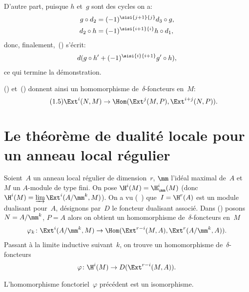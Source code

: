 D'autre part\pageoriginale, puisque $h$ et~$g$ sont des cycles on a:
\begin{align*}
g\circ d_{2} &= (-1)^{\sisi{j+1}{j}}d_{3}\circ g, \\
d_{2}\circ h &= (-1)^{\sisi{i+1}{i}}h\circ d_{1},
\end{align*}
donc, finalement,~() s'\'ecrit:
$$d(g\circ h^{\prime}+(-1)^{\sisi{i}{i+1}}g^{\prime}\circ h),
$$
ce qui termine la d\'emonstration.

() et~() donnent ainsi un homomorphisme de~$\delta$-foncteurs en~$M$:
\begin{equation*} \label{eq:V.1.5} \tag{1.5} \Ext^{i}(N, M)\to\Hom(\Ext^{j}(M, P), \Ext^{i+j}(N, P)).
\end{equation*}

\section{Le th\'eor\`eme de dualit\'e locale pour un anneau local r\'egulier} \label{V.2}

\setcounter{equation}{12}

Soient~$A$ un anneau local r\'egulier de dimension~$r$, $\mm$ l'id\'eal maximal de~$A$ et~$M$ un $A$-module de type fini. \label{pV2.4}On pose $\H^{i}(M)=\H^{i}_{\mm}(M)$ (donc $\H^{i}(M)=\varinjlim\Ext^{i}(A/\mm^{k}, M)$). On a vu (~) que~$I=\H^{r}(A)$ est un module dualisant pour~$A$, d\'esignons par~$D$ le foncteur dualisant associ\'e. Dans () posons $N=A/\mm^{k}$, $P=A$ alors on obtient un homomorphisme de~$\delta$-foncteurs en~$M$
\begin{equation} \label{eq:V.13} \varphi_{k}\colon\Ext^{i}(A/\mm^{k}, M)\to\Hom(\Ext^{r-i}(M, A), \Ext^{r}(A/\mm^{k}, A)).
\end{equation}
Passant \`a la limite inductive suivant~$k$, on trouve un homomorphisme de~$\delta$-foncteurs
\begin{equation} \label{eq:V.14} \varphi\colon\H^{i}(M)\to D(\Ext^{r-i}(M, A)).
\end{equation}

\begin{theoreme} \label{V.2.1}
L'homomorphisme fonctoriel~$\varphi$ pr\'ec\'edent est un isomorphisme.
\end{theoreme}

